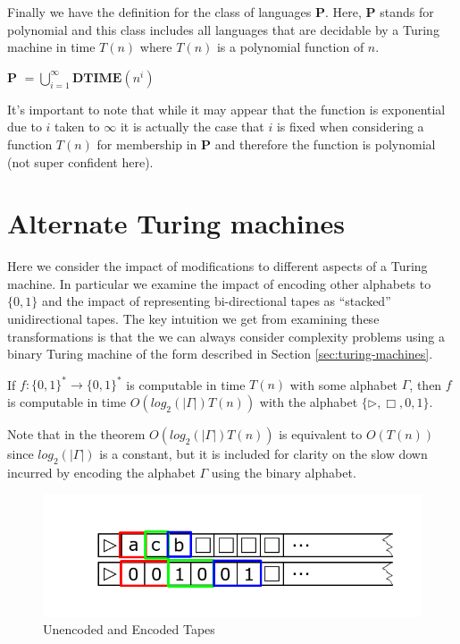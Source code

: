 \documentclass[usletter]{article}
\begin{document}
Finally we have the definition for the class of languages \textbf{P}. Here, \textbf{P} stands for polynomial and this class includes all languages that are decidable by a Turing machine in time $T(n)$ where $T(n)$ is a polynomial function of $n$.

\begin{definition}
  \textbf{P} $= \bigcup\limits_{i=1}^{\infty} \textbf{DTIME}(n^i)$
\end{definition}

It's important to note that while it may appear that the function is exponential due to $i$ taken to $\infty$ it is actually the case that $i$ is fixed when considering a function $T(n)$ for membership in \textbf{P} and therefore the function is polynomial (not super confident here).

\section{Alternate Turing machines}

Here we consider the impact of modifications to different aspects of a Turing machine. In particular we examine the impact of encoding other alphabets to $\{0,1\}$ and the impact of representing bi-directional tapes as ``stacked'' unidirectional tapes. The key intuition we get from examining these transformations is that the we can always consider complexity problems using a binary Turing machine of the form described in Section \ref{sec:turing-machines}.

\begin{theorem}
  If $f : \{0,1\}^* \rightarrow \{0,1\}^*$ is computable in time $T(n)$ with some alphabet $\Gamma$, then $f$ is computable in time $O(log_2(|\Gamma|)T(n))$ with the alphabet $\{\rhd,\Box, 0, 1\}$.
\end{theorem}

Note that in the theorem $O(log_2(|\Gamma|)T(n))$ is equivalent to $O(T(n))$ since $log_2(|\Gamma|)$ is a constant, but it is included for clarity on the slow down incurred by encoding the alphabet $\Gamma$ using the binary alphabet.

\begin{figure}
\begin{center}
\includegraphics[width=1\textwidth]{lectures/graphics/encoding}
\end{center}
\caption{Unencoded and Encoded Tapes}
\label{fig:encoding}
\end{figure}
\end{document}
